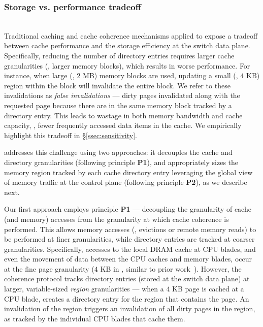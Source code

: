 \subsubsection{Storage vs. performance tradeoff}\label{ssec:storagevsperf}\hfill\\
Traditional caching and cache coherence mechanisms applied to \mind expose a tradeoff between cache performance and the storage efficiency at the switch data plane. Specifically, reducing the number of directory entries requires larger cache granularities (\ie, larger memory blocks), which results in worse performance. For instance, when large (\eg, $2$ MB) memory blocks are used, updating a small (\eg, $4$ KB) region within the block will invalidate the entire block. We refer to these invalidations as \emph{false invalidations} --- dirty pages invalidated along with the requested page because there are in the same memory block tracked by a directory entry. This leads to wastage in both memory bandwidth and cache capacity, \ie, fewer frequently accessed data items in the cache. We empirically highlight this tradeoff in \S\ref{ssec:sensitivity}.

\mind addresses this challenge using two approaches: it decouples the cache and directory granularities (following principle \textbf{P1}), and appropriately sizes the memory region tracked by each cache directory entry leveraging the global view of memory traffic at the control plane (following principle \textbf{P2}), as we describe next.

 Our first approach employs principle \textbf{P1} --- decoupling the granularity of cache (and memory) accesses from the granularity at which cache coherence is performed. This allows memory accesses (\eg, evictions or remote memory reads) to be performed at finer granularities, while directory entries are tracked at coarser granularities. Specifically, accesses to the local DRAM cache at CPU blades, and even the movement of data between the CPU caches and memory blades, occur at the fine page granularity ($4$ KB in \mind, similar to prior work~\cite{legoos, infiniswap, fastswap}). However, the coherence protocol tracks directory entries (stored at the switch data plane) at larger, variable-sized \textit{region} granularities --- when a $4$ KB page is cached at a CPU blade, \mind creates a directory entry for the region that contains the page. An invalidation of the region triggers an invalidation of all dirty pages in the region, as tracked by the individual CPU blades that cache them.

